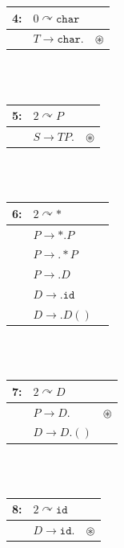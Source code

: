 \documentclass[fleqn]{article}
\begin{document}
\begin{enumerate}
  \begin{tabular}{| l   l  c |}
  \hline
  4: & $0 \curvearrowright \texttt{char}$ &               \\
  \hline
  \hline
     & $T \rightarrow \texttt{char}.$     & $\circledast$ \\
  \hline
  \end{tabular}\\\\

  \begin{tabular}{| l   l  c |}
  \hline
  5: & $2 \curvearrowright P$ &               \\
  \hline
  \hline
     & $S \rightarrow TP.$    & $\circledast$ \\
  \hline
  \end{tabular}\\\\

  \begin{tabular}{| l   l  c |}
  \hline
  6: & $2 \curvearrowright *$       & \\
  \hline
  \hline
     & $P \rightarrow *.P$          & \\
     & $P \rightarrow .*P$          & \\
     & $P \rightarrow .D$           & \\
     & $D \rightarrow .\texttt{id}$ & \\
     & $D \rightarrow .D()$         & \\
  \hline
  \end{tabular}\\\\

  \begin{tabular}{| l   l  c |}
  \hline
  7: & $2 \curvearrowright D$ &               \\
  \hline
  \hline
     & $P \rightarrow D.$     & $\circledast$ \\
     & $D \rightarrow D.()$   &               \\
  \hline
  \end{tabular}\\\\

  \begin{tabular}{| l   l  c |}
  \hline
  8: & $2 \curvearrowright \texttt{id}$ &               \\
  \hline
  \hline
     & $D \rightarrow \texttt{id}.$     & $\circledast$ \\
  \hline
  \end{tabular}\\\\


\end{enumerate}
\end{document}
